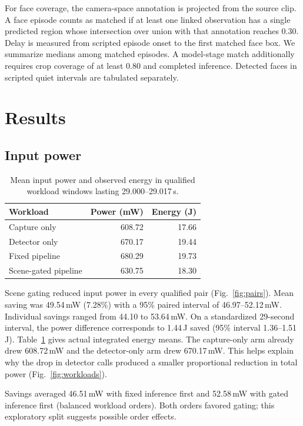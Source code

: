 \documentclass[10pt,letterpaper,twocolumn]{article}
\begin{document}
For face coverage, the camera-space annotation is projected from the source clip. A face episode counts as matched if at least one linked observation has a single predicted region whose intersection over union with that annotation reaches 0.30. Delay is measured from scripted episode onset to the first matched face box. We summarize medians among matched episodes. A model-stage match additionally requires crop coverage of at least 0.80 and completed inference. Detected faces in scripted quiet intervals are tabulated separately.

\section{Results}
\subsection{Input power}
\begin{table}[t]
\centering
\caption{Mean input power and observed energy in qualified workload windows lasting 29.000--29.017\,s.}
\label{tab:power}
\small
\begin{tabular}{@{}lrr@{}}
\toprule
Workload & Power (mW) & Energy (J)\\
\midrule
Capture only & 608.72 & 17.66\\
Detector only & 670.17 & 19.44\\
Fixed pipeline & 680.29 & 19.73\\
Scene-gated pipeline & 630.75 & 18.30\\
\bottomrule
\end{tabular}
\end{table}

Scene gating reduced input power in every qualified pair (Fig.~\ref{fig:pairs}). Mean saving was 49.54\,mW (7.28\%) with a 95\% paired interval of 46.97--52.12\,mW. Individual savings ranged from 44.10 to 53.64\,mW. On a standardized 29-second interval, the power difference corresponds to 1.44\,J saved (95\% interval 1.36--1.51\,J). Table~\ref{tab:power} gives actual integrated energy means. The capture-only arm already drew 608.72\,mW and the detector-only arm drew 670.17\,mW. This helps explain why the drop in detector calls produced a smaller proportional reduction in total power (Fig.~\ref{fig:workloads}).

Savings averaged 46.51\,mW with fixed inference first and 52.58\,mW with gated inference first (balanced workload orders). Both orders favored gating; this exploratory split suggests possible order effects.
\end{document}
